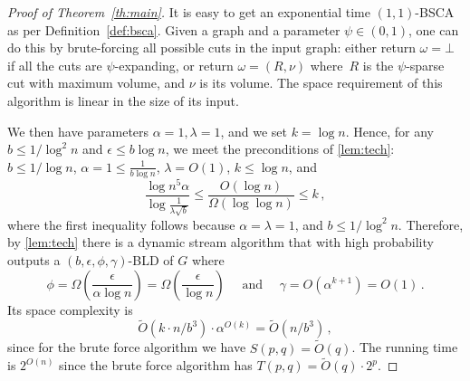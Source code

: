 \documentclass[epsfig,letter,11pt]{article}
\numberwithin{equation}{section}
\newcommand{\otil}{\tilde{O}}
\renewcommand{\tilde}{\widetilde}
\begin{document}
\begin{proof}[Proof of Theorem~\ref{th:main}]
	It is easy to get an exponential time $(1,1)$-BSCA as per Definition~\ref{def:bsca}. Given a graph and a parameter $\psi \in (0,1)$, one can do this by brute-forcing all possible cuts in the input graph: either return $\omega=\bot$ if all the cuts are $\psi$-expanding, or return $\omega=(R,\nu)$ where~$R$ is the $\psi$-sparse cut with maximum volume, and $\nu$ is its volume. The space requirement of this algorithm is linear in the size of its input.
	
	We then have parameters $\alpha=1,\lambda=1$, and we set $k=\log n$.  Hence, for any $b \le 1/\log^2 n$ and $\epsilon \le b \log n$, we meet the preconditions  of  \cref{lem:tech}: $b \le 1/\log n$, $\alpha = 1 \le \frac{1}{b\log n}$, $\lambda= O(1)$, $k \le \log n$, and
	\begin{equation*}
		\frac{\log {n^5\alpha }}{\log  \frac{1}{\lambda \sqrt{b}}} \le \frac{O(\log n)}{\Omega(\log \log n)} \le k \, ,
	\end{equation*}
	where the first inequality follows because $\alpha=\lambda=1$, and $b \le 1/\log^2 n$.
	Therefore, by \cref{lem:tech} there is a dynamic stream algorithm that with high probability outputs a $(b, \epsilon, \phi, \gamma)$-BLD of $G$ where
	\begin{equation*}
		\phi = \Omega\left(\frac{\epsilon}{\alpha \log n}\right) = \Omega\left(\frac{\epsilon}{ \log n}\right) \quad \text{ and } \quad \gamma = O(\alpha^{k+1})= O(1) \, .
	\end{equation*}
	Its space complexity is
	\begin{equation*}
		\otil(k \cdot n/b^3) \cdot \alpha^{O(k)} = \otil(n/b^3) \, ,
	\end{equation*}
	since for the brute force algorithm we have $S(p,q)=\otil(q)$. The running time is $2^{O(n)}$ since the brute force algorithm has $T(p,q)=\otil(q)\cdot 2^p$.
\end{proof}
\end{document}
